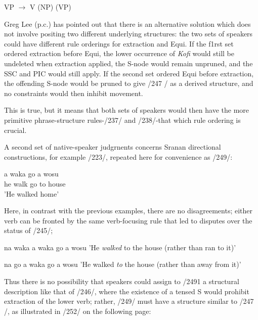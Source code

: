 \ea\label{ex:248}
 VP {$\to$} V (NP) (VP)
\z

Greg Lee (p.c.) has pointed out that there is an alternative solution which does not involve positing two different underlying structures: the two sets of speakers could have different rule orderings for extraction and Equi. If the f1rst set ordered extraction before Equi, the lower occurrence of \textit{Kofi} would still be undeleted when extraction applied, the S-node would remain unpruned, and the SSC and PIC would still apply. If the second set ordered Equi before ex\-traction, the offending S-node would be pruned to give /247 / as a derived structure, and no constraints would then inhibit movement.

This is true, but it means that both sets of speakers would then
have the more primitive phrase-structure rules-/237/ and /238/-that
which rule ordering is crucial.

A second set of native-speaker judgrnents concerns Sranan directional constructions, for example /223/, repeated here for conveni\-ence as /249/:

\ea\label{ex:249}
\gll  a waka go a wosu\\
he walk go to house \\
\glt 'He walked home'
\z

 

Here, in contrast with the previous examples, there are no disagree\-ments; either verb can be fronted by the same verb-focusing rule that led to disputes over the status of /245/;

\ea\label{ex:250}
 na waka a waka go a wosu
\glt 'He \textit{walked} to the house (rather than ran to it)'
\z



\ea\label{ex:251}
 na go a waka go a wosu
\glt 'He walked \textit{to} the house (rather than away from it)'
\z



Thus there is no possibility that speakers could assign to /2491 a struc\-tural description like that of /246/, where the existence of a tensed S would prohibit extraction of the lower verb; rather, /249/ must have a structure similar to /247 /, as illustrated in /252/ on the following page:



